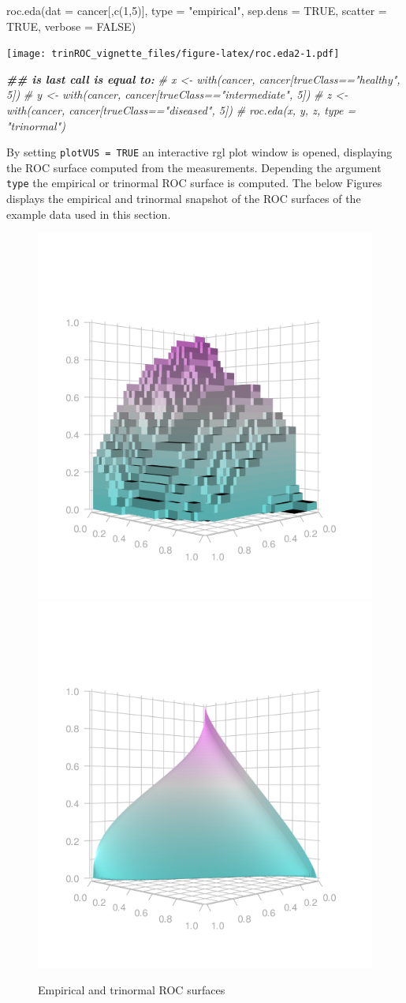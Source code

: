\documentclass[
]{article}
\newenvironment{Shaded}{\begin{snugshade}}{\end{snugshade}}
\newcommand{\AttributeTok}[1]{\textcolor[rgb]{0.77,0.63,0.00}{#1}}
\newcommand{\CommentTok}[1]{\textcolor[rgb]{0.56,0.35,0.01}{\textit{#1}}}
\newcommand{\ConstantTok}[1]{\textcolor[rgb]{0.00,0.00,0.00}{#1}}
\newcommand{\DecValTok}[1]{\textcolor[rgb]{0.00,0.00,0.81}{#1}}
\newcommand{\DocumentationTok}[1]{\textcolor[rgb]{0.56,0.35,0.01}{\textbf{\textit{#1}}}}
\newcommand{\FunctionTok}[1]{\textcolor[rgb]{0.00,0.00,0.00}{#1}}
\newcommand{\NormalTok}[1]{#1}
\newcommand{\StringTok}[1]{\textcolor[rgb]{0.31,0.60,0.02}{#1}}
\begin{document}
\begin{Shaded}
\begin{Highlighting}[]
\FunctionTok{roc.eda}\NormalTok{(}\AttributeTok{dat =}\NormalTok{ cancer[,}\FunctionTok{c}\NormalTok{(}\DecValTok{1}\NormalTok{,}\DecValTok{5}\NormalTok{)], }\AttributeTok{type =} \StringTok{"empirical"}\NormalTok{, }\AttributeTok{sep.dens =} \ConstantTok{TRUE}\NormalTok{, }\AttributeTok{scatter =} \ConstantTok{TRUE}\NormalTok{, }
        \AttributeTok{verbose =} \ConstantTok{FALSE}\NormalTok{)}
\end{Highlighting}
\end{Shaded}

\texttt{[image: trinROC\_vignette\_files/figure-latex/roc.eda2-1.pdf]}

\begin{Shaded}
\begin{Highlighting}[]
\DocumentationTok{\#\# is last call is equal to:}
\CommentTok{\# x \textless{}{-} with(cancer, cancer[trueClass=="healthy", 5])}
\CommentTok{\# y \textless{}{-} with(cancer, cancer[trueClass=="intermediate", 5])}
\CommentTok{\# z \textless{}{-} with(cancer, cancer[trueClass=="diseased", 5])}
\CommentTok{\# roc.eda(x, y, z, type = "trinormal")}
\end{Highlighting}
\end{Shaded}

By setting \texttt{plotVUS\ =\ TRUE} an interactive rgl plot window is
opened, displaying the ROC surface computed from the measurements.
Depending the argument \texttt{type} the empirical or trinormal ROC
surface is computed. The below Figures displays the empirical and
trinormal snapshot of the ROC surfaces of the example data used in this
section.

\begin{figure}
\includegraphics[width=0.45\linewidth]{Figures//empVUS} \includegraphics[width=0.45\linewidth]{Figures//trinVUS} \caption{Empirical and trinormal ROC surfaces}\label{fig:figsfigs}
\end{figure}
\end{document}
